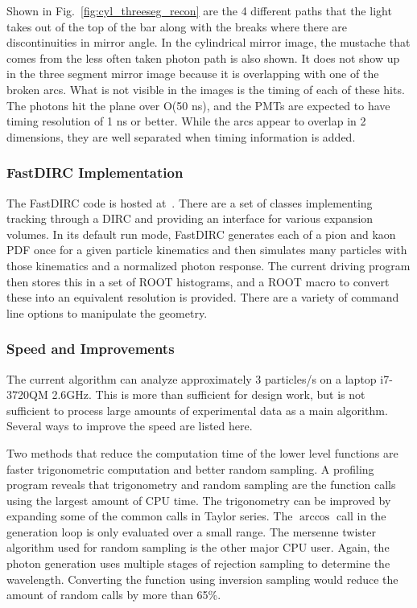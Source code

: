 Shown in Fig.~\ref{fig:cyl_threeseg_recon} are the 4 different paths that the light takes out of the top of the bar along with the breaks where there are discontinuities in mirror angle.  In the cylindrical mirror image, the mustache that comes from the less often taken photon path is also shown.  It does not show up in the three segment mirror image because it is overlapping with one of the broken arcs.  What is not visible in the images is the timing of each of these hits.  The photons hit the plane over O(50 ns), and the PMTs are expected to have timing resolution of 1 ns or better.  While the arcs appear to overlap in 2 dimensions, they are well separated when timing information is added.

\subsubsection*{FastDIRC Implementation}

The FastDIRC code is hosted at~\cite{hardinGithub}.  There are a set of classes implementing tracking through a DIRC and providing an interface for various expansion volumes.  In its default run mode, FastDIRC generates each of a pion and kaon PDF once for a given particle kinematics and then simulates many particles with those kinematics and a normalized photon response.  The current driving program then stores this in a set of ROOT histograms, and a ROOT macro to convert these into an equivalent resolution is provided.  There are a variety of command line options to manipulate the geometry.


\subsubsection*{Speed and Improvements}
The current algorithm can analyze approximately 3 particles/s on a laptop i7-3720QM 2.6GHz.  This is more than sufficient for design work, but is not sufficient to process large amounts of experimental data as a main algorithm.  Several ways to improve the speed are listed here.

Two methods that reduce the computation time of the lower level functions are faster trigonometric computation and better random sampling.  A profiling program reveals that trigonometry and random sampling are the function calls using the largest amount of CPU time.  The trigonometry can be improved by expanding some of the common calls in Taylor series.  The $\arccos$ call in the generation loop is only evaluated over a small range.  The mersenne twister algorithm used for random sampling is the other major CPU user.  Again, the photon generation uses multiple stages of rejection sampling to determine the wavelength.  Converting the function using inversion sampling would reduce the amount of random calls by more than 65\%.

